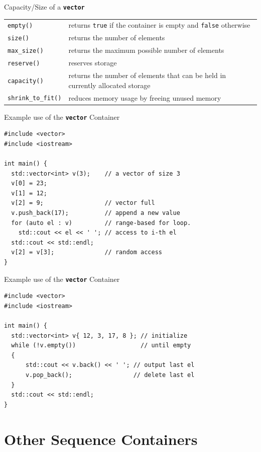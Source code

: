 \documentclass[14pt,aspectratio=1610]{beamer}
\begin{document}
\begin{frame}{Capacity/Size of a \texttt{\bfseries vector}}
\renewcommand{\arraystretch}{1.2}
\begin{tabularx}{1\textwidth}{l X}
\lstinline{empty()} &
  returns \lstinline{true} if the container is empty and \lstinline{false} otherwise \\
\lstinline{size()} &
  returns the number of elements\\
\lstinline{max_size()} &
  returns the maximum possible number of elements\\
\lstinline{reserve()} &
  reserves storage\\
\lstinline{capacity()} &
  returns the number of elements that can be held in currently allocated storage\\
\lstinline{shrink_to_fit()} &
  reduces memory usage by freeing unused memory\\
\end{tabularx}
\end{frame}

\begin{frame}[fragile]{Example use of the \texttt{\bfseries vector} Container}
  \small
\begin{lstlisting}
#include <vector>
#include <iostream>

int main() {
  std::vector<int> v(3);    // a vector of size 3
  v[0] = 23;
  v[1] = 12;
  v[2] = 9;                 // vector full
  v.push_back(17);          // append a new value
  for (auto el : v)         // range-based for loop.
    std::cout << el << ' '; // access to i-th el
  std::cout << std::endl;
  v[2] = v[3];              // random access
}
\end{lstlisting}
\end{frame}

\begin{frame}[fragile]{Example use of the \texttt{\bfseries vector} Container}
  \small
\begin{lstlisting}
#include <vector>
#include <iostream>

int main() {
  std::vector<int> v{ 12, 3, 17, 8 }; // initialize
  while (!v.empty())                  // until empty
  {
      std::cout << v.back() << ' '; // output last el
      v.pop_back();                 // delete last el
  }
  std::cout << std::endl;
}
\end{lstlisting}
\end{frame}

\section{Other Sequence Containers}
\end{document}
